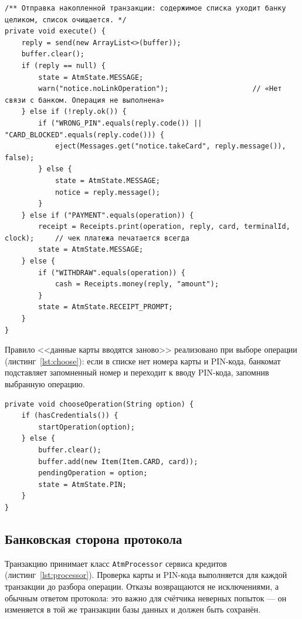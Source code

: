 \documentclass[14pt,a4paper]{extarticle}
\begin{document}
\begin{lstlisting}[style=java, caption={Отправка транзакции банку (\texttt{AtmSession.execute})}, label={lst:execute}]
/** Отправка накопленной транзакции: содержимое списка уходит банку целиком, список очищается. */
private void execute() {
    reply = send(new ArrayList<>(buffer));
    buffer.clear();
    if (reply == null) {
        state = AtmState.MESSAGE;
        warn("notice.noLinkOperation");                    // «Нет связи с банком. Операция не выполнена»
    } else if (!reply.ok()) {
        if ("WRONG_PIN".equals(reply.code()) || "CARD_BLOCKED".equals(reply.code())) {
            eject(Messages.get("notice.takeCard", reply.message()), false);
        } else {
            state = AtmState.MESSAGE;
            notice = reply.message();
        }
    } else if ("PAYMENT".equals(operation)) {
        receipt = Receipts.print(operation, reply, card, terminalId, clock);     // чек платежа печатается всегда
        state = AtmState.MESSAGE;
    } else {
        if ("WITHDRAW".equals(operation)) {
            cash = Receipts.money(reply, "amount");
        }
        state = AtmState.RECEIPT_PROMPT;
    }
}
\end{lstlisting}

Правило <<данные карты вводятся заново>> реализовано при выборе операции
(листинг~\ref{lst:choose}): если в списке нет номера карты и PIN-кода, банкомат подставляет
запомненный номер и переходит к вводу PIN-кода, запомнив выбранную операцию.

\begin{lstlisting}[style=java, caption={Повторный ввод данных карты (\texttt{AtmSession.chooseOperation})}, label={lst:choose}]
private void chooseOperation(String option) {
    if (hasCredentials()) {
        startOperation(option);
    } else {
        buffer.clear();
        buffer.add(new Item(Item.CARD, card));
        pendingOperation = option;
        state = AtmState.PIN;
    }
}
\end{lstlisting}

\subsection{Банковская сторона протокола}

Транзакцию принимает класс \texttt{AtmProcessor} сервиса кредитов
(листинг~\ref{lst:processor}). Проверка карты и PIN-кода выполняется для каждой транзакции
до разбора операции. Отказы возвращаются не исключениями, а обычным ответом протокола: это
важно для счётчика неверных попыток --- он изменяется в той же транзакции базы данных и
должен быть сохранён.
\end{document}
